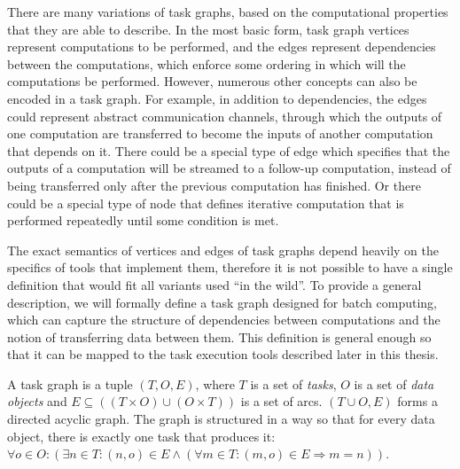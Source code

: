 There are many variations of task graphs, based on the computational properties that they are able
to describe. In the most basic form, task graph vertices represent computations to be performed,
and the edges represent dependencies between the computations, which enforce some ordering in which
will the computations be performed. However, numerous other concepts can also be encoded in a task
graph. For example, in addition to dependencies, the edges could represent abstract communication
channels, through which the outputs of one computation are transferred to become the inputs of
another computation that depends on it. There could be a special type of edge which specifies that
the outputs of a computation will be streamed to a follow-up computation, instead of being
transferred only after the previous computation has finished. Or there could be a special type of
node that defines iterative computation that is performed repeatedly until some condition is met.

The exact semantics of vertices and edges of task graphs depend heavily on the specifics of tools
that implement them, therefore it is not possible to have a single definition that would fit all
variants used ``in the wild''. To provide a general description, we will formally define a task
graph designed for batch computing, which can capture the structure of dependencies between
computations and the notion of transferring data between them. This definition is general enough so
that it can be mapped to the task execution tools described later in this thesis.

A task graph is a tuple $(T, O, E)$, where $T$ is a set of
\emph{tasks}, $O$ is a set of \emph{data objects} and
$E \subseteq ((T\times{}O) \cup (O\times{}T))$ is a set of arcs. $(T \cup O, E)$ forms a directed acyclic graph. The
graph is structured in a way so that for every data object, there is exactly one task that produces
it: $\forall o\in{}O: (\exists n\in{}T: (n, o) \in E \land (\forall
m\in{}T: (m, o) \in E \Rightarrow m = n))$.

